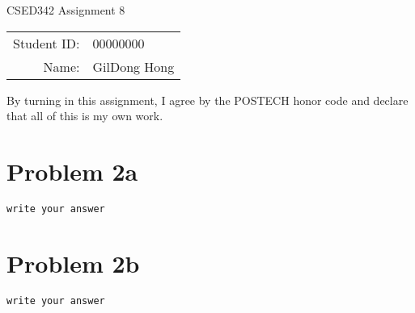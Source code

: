 \documentclass[12pt]{article}
\begin{document}
\begin{center}
{\Large CSED342 Assignment 8 \vspace{10pt}}

\begin{tabular}{rl}
Student ID: & 00000000 \\
Name: & GilDong Hong \\
\end{tabular}
\end{center}

\begin{center}
By turning in this assignment, I agree by the POSTECH honor code and declare that all of this is my own work.
\end{center}

\section*{Problem 2a}

\verb|write your answer|

\section*{Problem 2b}

\verb|write your answer|
\end{document}
